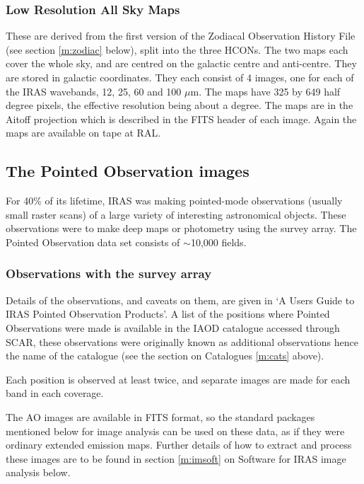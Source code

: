 \documentclass[11pt,nolof,noabs]{starlink}
\begin{document}
\subsubsection{Low Resolution All Sky Maps}
These are derived from the first version of the Zodiacal Observation History
File (see section \ref{m:zodiac} below), split into the three HCONs.
The two maps each cover the whole sky, and are centred on the galactic centre
and anti-centre.
They are stored in galactic coordinates.
They each consist of 4 images, one for each of the IRAS wavebands, 12, 25,
60 and 100 $\mu$m.
The maps have 325 by 649 half degree pixels, the effective resolution being
about a degree.
The maps are in the Aitoff projection which is described in the FITS header of
each image.
Again the maps are available on tape at RAL.

\subsection{The Pointed Observation images}
For 40\% of its lifetime, IRAS was making pointed-mode observations (usually
small raster scans) of a large variety of interesting astronomical objects.
These observations were to make deep maps or photometry using the survey array.
The Pointed Observation data set consists of $\sim$10,000 fields.


\subsubsection{Observations with the survey array}
Details of the observations, and caveats on them, are given in `A Users Guide to
IRAS Pointed Observation Products'.
A list of the positions where Pointed Observations were made is available
in the IAOD catalogue accessed through SCAR, these observations were originally
known as additional observations hence the name of the catalogue (see the
section on Catalogues \ref{m:cats} above).

Each position is observed at least twice, and separate images are made for each
band in each coverage.

The AO images are available in FITS format, so the standard packages mentioned
below for image analysis can be used on these data, as if they were ordinary
extended emission maps. Further details of how to extract and process these
images are to be found in section \ref{m:imsoft} on Software for IRAS image
analysis below.
\end{document}

